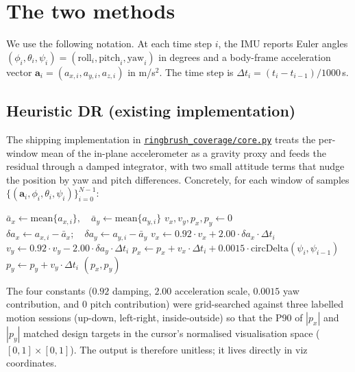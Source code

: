 \documentclass[a4paper,11pt]{article}
\begin{document}
\section{The two methods}

We use the following notation. At each time step $i$, the IMU reports Euler
angles $(\phi_i, \theta_i, \psi_i) = (\mathrm{roll}_i, \mathrm{pitch}_i,
\mathrm{yaw}_i)$ in degrees and a body-frame acceleration vector
$\mathbf{a}_i = (a_{x,i}, a_{y,i}, a_{z,i})$ in m/s$^2$. The time step is
$\Delta t_i = (t_i - t_{i-1})/1000$\,s.

\subsection{Heuristic DR (existing implementation)}

The shipping implementation in
\href{../ringbrush_coverage/core.py}{\texttt{ringbrush\_coverage/core.py}}
treats the per-window mean of the in-plane accelerometer as a gravity proxy
and feeds the residual through a damped integrator, with two small attitude
terms that nudge the position by yaw and pitch differences. Concretely, for
each window of samples $\{(\mathbf{a}_i, \phi_i, \theta_i, \psi_i)\}_{i=0}^{N-1}$:

\begin{algorithm}[H]
\caption{Heuristic dead reckoning (per window).}
\label{alg:heuristic}
\begin{algorithmic}[1]
\State $\bar a_x \gets \mathrm{mean}\{a_{x,i}\}, \quad \bar a_y \gets \mathrm{mean}\{a_{y,i}\}$
\State $v_x, v_y, p_x, p_y \gets 0$
    \State $\delta a_x \gets a_{x,i} - \bar a_x; \quad \delta a_y \gets a_{y,i} - \bar a_y$
    \State $v_x \gets 0.92 \cdot v_x + 2.00 \cdot \delta a_x \cdot \Delta t_i$
    \State $v_y \gets 0.92 \cdot v_y - 2.00 \cdot \delta a_y \cdot \Delta t_i$
    \State $p_x \gets p_x + v_x \cdot \Delta t_i + 0.0015 \cdot \mathrm{circDelta}(\psi_i, \psi_{i-1})$
    \State $p_y \gets p_y + v_y \cdot \Delta t_i$
\EndFor
\State \Return $(p_x, p_y)$
\end{algorithmic}
\end{algorithm}

The four constants ($0.92$ damping, $2.00$ acceleration scale, $0.0015$ yaw
contribution, and $0$ pitch contribution) were grid-searched against three
labelled motion sessions (up-down, left-right, inside-outside) so that the
P90 of $|p_x|$ and $|p_y|$ matched design targets in the cursor's normalised
visualisation space ($[0, 1] \times [0, 1]$). The output is therefore unitless;
it lives directly in viz coordinates.
\end{document}
